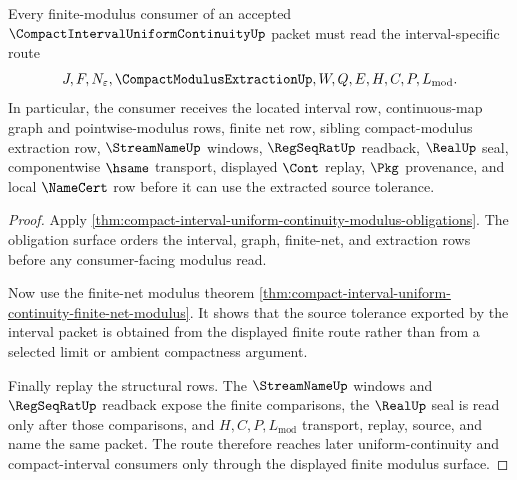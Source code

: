 \begin{theorem}
\label{thm:compact-interval-uniform-continuity-finite-net-route}
Every finite-modulus consumer of an accepted
$\CompactIntervalUniformContinuityUp$ packet must read the interval-specific
route
$$
J,F,N_\varepsilon,\CompactModulusExtractionUp,W,Q,E,H,C,P,L_{\mathrm{mod}} .
$$
In particular, the consumer receives the located interval row, continuous-map
graph and pointwise-modulus rows, finite net row, sibling compact-modulus
extraction row, $\StreamNameUp$ windows, $\RegSeqRatUp$ readback, $\RealUp$
seal, componentwise $\hsame$ transport, displayed $\Cont$ replay, $\Pkg$
provenance, and local $\NameCert$ row before it can use the extracted source
tolerance.
\end{theorem}
\begin{proof}
Apply \autoref{thm:compact-interval-uniform-continuity-modulus-obligations}.
The obligation surface orders the interval, graph, finite-net, and extraction
rows before any consumer-facing modulus read.

Now use the finite-net modulus theorem
\autoref{thm:compact-interval-uniform-continuity-finite-net-modulus}. It shows
that the source tolerance exported by the interval packet is obtained from the
displayed finite route rather than from a selected limit or ambient compactness
argument.

Finally replay the structural rows. The $\StreamNameUp$ windows and
$\RegSeqRatUp$ readback expose the finite comparisons, the $\RealUp$ seal is
read only after those comparisons, and $H,C,P,L_{\mathrm{mod}}$ transport,
replay, source, and name the same packet. The route therefore reaches later
uniform-continuity and compact-interval consumers only through the displayed
finite modulus surface.
\end{proof}

